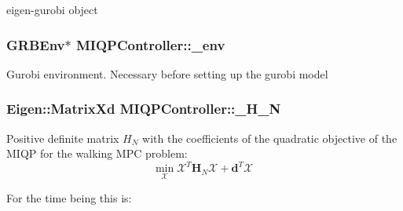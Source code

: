 eigen-\/gurobi object \hypertarget{classMIQPController_aec530057d97a52549fdc3823a48f73cf}{
\subsubsection[{\-\_\-env}]{\setlength{\rightskip}{0pt plus 5cm}\-G\-R\-B\-Env$\ast$ {\bf \-M\-I\-Q\-P\-Controller\-::\-\_\-env}}}\label{classMIQPController_aec530057d97a52549fdc3823a48f73cf}
\-Gurobi environment. \-Necessary before setting up the gurobi model \hypertarget{classMIQPController_ab4b99d844add54fa7ad6ca6b80cab089}{
\subsubsection[{\-\_\-\-H\-\_\-\-N}]{\setlength{\rightskip}{0pt plus 5cm}\-Eigen\-::\-Matrix\-Xd {\bf \-M\-I\-Q\-P\-Controller\-::\-\_\-\-H\-\_\-\-N}}}\label{classMIQPController_ab4b99d844add54fa7ad6ca6b80cab089}
\-Positive definite matrix $H_N$ with the coefficients of the quadratic objective of the \-M\-I\-Q\-P for the walking \-M\-P\-C problem\-: \[ \underset{\mathcal{X}}{\text{min}} \; \mathcal{X}^T \mathbf{H}_N \mathcal{X} + \mathbf{d}^T \mathcal{X} \]

\-For the time being this is\-:

